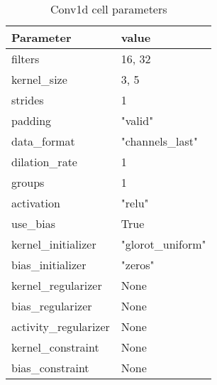 \begin{table}[H]
  \centering
  \caption{Conv1d cell parameters}
  \label{table:Conv1d-cell-parameters}
  \begin{tabular}{|l|l|}\hline
    Parameter             & value             \\ \hline
    \hline
    filters               & 16, 32            \\ \hline
    kernel\_size          & 3, 5              \\ \hline
    strides               & 1                 \\ \hline
    padding               & "valid"           \\ \hline
    data\_format          & "channels\_last"  \\ \hline
    dilation\_rate        & 1                 \\ \hline
    groups                & 1                 \\ \hline
    activation            & "relu"            \\ \hline
    use\_bias             & True              \\ \hline
    kernel\_initializer   & "glorot\_uniform" \\ \hline
    bias\_initializer     & "zeros"           \\ \hline
    kernel\_regularizer   & None              \\ \hline
    bias\_regularizer     & None              \\ \hline
    activity\_regularizer & None              \\ \hline
    kernel\_constraint    & None              \\ \hline
    bias\_constraint      & None              \\ \hline
    \hline
  \end{tabular}
\end{table}


